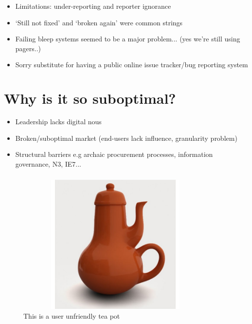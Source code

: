 \documentclass[handout, red]{beamer}
\begin{document}
\begin{frame}
\begin{itemize}
  \item Limitations: under-reporting and reporter ignorance
  \item `Still not fixed' and `broken again' were common strings
  \item Failing bleep systems seemed to be a major problem... (yes we're still using pagers..)
  \item Sorry substitute for having a public online issue tracker/bug reporting system
 \end{itemize}
\end{frame}	


\section{Why is it so suboptimal?}
\begin{frame}
\begin{itemize}
  \item Leadership lacks digital nous 
  \item Broken/suboptimal market (end-users lack influence, granularity problem)
  \item Structural barriers e.g archaic procurement processes, information governance, N3, IE7...
 \end{itemize}
\end{frame}	
  
\begin{frame}
  \frametitle{}   %
  
\begin{figure}[htp]
\centering
\includegraphics[width=10cm,height=7cm]{figs/badcoffeepot.jpg}
\caption{This is a user unfriendly tea pot}\label{fig:bugsa}
\end{figure}
\end{frame}
  
\end{document}
